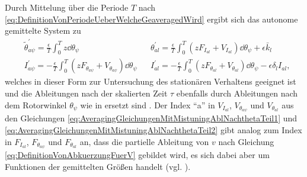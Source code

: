 Durch  Mittelung über die Periode $T$ nach \eqref{eq:DefinitionVonPeriodeUeberWelcheGeaveragedWird}
ergibt sich das autonome gemittelte System zu 
%
\begin{align}
		& \tilde{\theta}_{a \psi}^\prime = \frac{\epsilon}{T} \int_0^T   z \dd \theta_{\psi}  &  
		& \theta_{al}^\prime = \frac{\epsilon}{T} \int_0^T   \left(  z F_{I_{al}} + V_{I_{al}} \right)  \dd \theta_{\psi}        + \epsilon \bar{k}_l  	\label{eq:AveragingGleichungenMitMistuningAblNachthetaTeil1}\\
		& I_{a \psi}^\prime = - \frac{\epsilon}{T} \int_0^T  \left( z F_{\theta_{a\psi}} + V_{\theta_{a\psi}}  \right)  \dd \theta_{\psi}  %
																																											 &
		& I_{al}^\prime = - \frac{\epsilon}{T} \int_0^T   \left( z F_{\theta_{al}}  + V_{\theta_{al}}  \right) \dd \theta_{\psi}        - \epsilon \delta_l I_{al} ,
	\label{eq:AveragingGleichungenMitMistuningAblNachthetaTeil2}
\end{align}
welches in dieser Form zur Untersuchung des stationären Verhaltens geeignet ist und
die Ableitungen nach der skalierten Zeit $\tau$ ebenfalls durch Ableitungen
nach dem Rotorwinkel $\theta_{\psi}$ wie in  ersetzt sind \cite{Mayet:CPVAMitMistuning, Mayet:Tautochronic}.
%
% 
Der Index "`a"' in $V_{I_{al}} $, $V_{\theta_{a\psi}}$ und $V_{\theta_{al}}$
aus den Gleichungen \eqref{eq:AveragingGleichungenMitMistuningAblNachthetaTeil1} und  	\eqref{eq:AveragingGleichungenMitMistuningAblNachthetaTeil2} 
gibt analog zum Index  in $F_{I_{al}} $, $F_{\theta_{a\psi}}$ und $F_{\theta_{al}}$ an, 
dass die partielle Ableitung von $v$ nach Gleichung 	\eqref{eq:DefinitionVonAbkuerzungFuerV} gebildet wird, 
es sich dabei aber um Funktionen der gemittelten Größen handelt (vgl. ).



